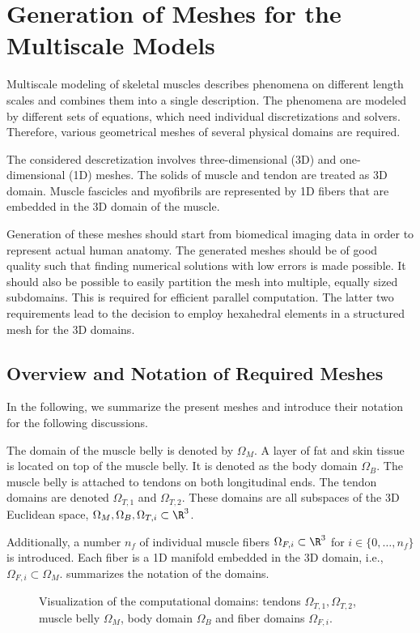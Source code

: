 
\chapter{Generation of Meshes for the Multiscale Models}
Multiscale modeling of skeletal muscles describes phenomena on different length scales and combines them into a single description. The phenomena are modeled by different sets of equations, which need individual discretizations and solvers. Therefore, various geometrical meshes of several physical domains are required.

The considered descretization involves three-dimensional (3D) and one-dimensional (1D) meshes.
The solids of muscle and tendon are treated as 3D domain. Muscle fascicles and myofibrils are represented by 1D fibers that are embedded in the 3D domain of the muscle.

Generation of these meshes should start from biomedical imaging data in order to represent actual human anatomy. The generated meshes should be of good quality such that finding numerical solutions with low errors is made possible. It should also be possible to easily partition the mesh into multiple, equally sized subdomains. This is required for efficient parallel computation.
The latter two requirements lead to the decision to employ hexahedral elements in a structured mesh for the 3D domains.

\section{Overview and Notation of Required Meshes}
In the following, we summarize the present meshes and introduce their notation for the following discussions.

The domain of the muscle belly is denoted by $\Omega_M$. A layer of fat and skin tissue is located on top of the muscle belly. It is denoted as the body domain $\Omega_B$.
The muscle belly is attached to tendons on both longitudinal ends. The tendon domains are denoted $\Omega_{T,1}$ and $\Omega_{T,2}$. These domains are all subspaces of the 3D Euclidean space, $\Omega_M,\Omega_B,\Omega_{T,i} \subset \R^3$.

Additionally, a number $n_f$ of individual muscle fibers $\Omega_{F,i} \subset \R^3$ for $i \in \{0,\dots,n_f\}$ is introduced. Each fiber is a 1D manifold embedded in the 3D domain, i.e., $\Omega_{F,i} \subset \Omega_M$.  summarizes the notation of the domains.

\begin{figure}%
    \centering%
    \def\svgwidth{8cm}%
    \caption{Visualization of the computational domains: tendons $\Omega_{T,1}, \Omega_{T,2}$, muscle belly $\Omega_M$, body domain $\Omega_B$ and fiber domains $\Omega_{F,i}$.}%
    \label{fig:fibers_domains}%
\end{figure}%

